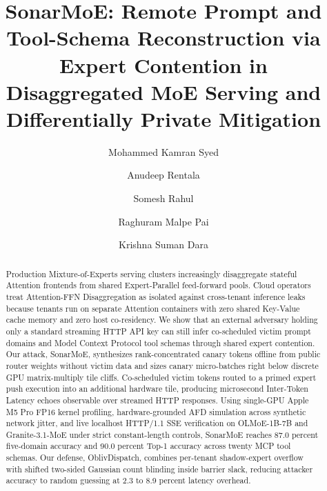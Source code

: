 \documentclass[final,5p,times,twocolumn]{elsarticle}
\theoremstyle{definition}
\theoremstyle{remark}
\begin{document}
\begin{frontmatter}

\title{SonarMoE: Remote Prompt and Tool-Schema Reconstruction via Expert Contention in Disaggregated MoE Serving and Differentially Private Mitigation}

\author[1]{Mohammed Kamran Syed}

\author[2]{Anudeep Rentala}

\author[2]{Somesh Rahul}

\author[3]{Raghuram Malpe Pai}

\author[3]{Krishna Suman Dara}




\begin{abstract}
Production Mixture-of-Experts serving clusters increasingly disaggregate stateful Attention frontends from shared Expert-Parallel feed-forward pools. Cloud operators treat Attention-FFN Disaggregation as isolated against cross-tenant inference leaks because tenants run on separate Attention containers with zero shared Key-Value cache memory and zero host co-residency. We show that an external adversary holding only a standard streaming HTTP API key can still infer co-scheduled victim prompt domains and Model Context Protocol tool schemas through shared expert contention. Our attack, SonarMoE, synthesizes rank-concentrated canary tokens offline from public router weights without victim data and sizes canary micro-batches right below discrete GPU matrix-multiply tile cliffs. Co-scheduled victim tokens routed to a primed expert push execution into an additional hardware tile, producing microsecond Inter-Token Latency echoes observable over streamed HTTP responses. Using single-GPU Apple M5 Pro FP16 kernel profiling, hardware-grounded AFD simulation across synthetic network jitter, and live localhost HTTP/1.1 SSE verification on OLMoE-1B-7B and Granite-3.1-MoE under strict constant-length controls, SonarMoE reaches 87.0 percent five-domain accuracy and 90.0 percent Top-1 accuracy across twenty MCP tool schemas. Our defense, OblivDispatch, combines per-tenant shadow-expert overflow with shifted two-sided Gaussian count blinding inside barrier slack, reducing attacker accuracy to random guessing at 2.3 to 8.9 percent latency overhead.
\end{abstract}


\end{frontmatter}
\end{document}
